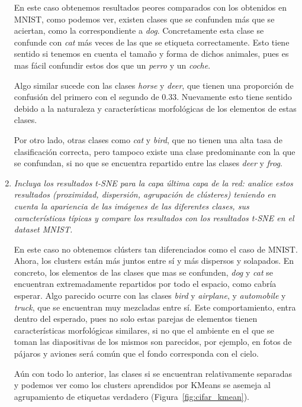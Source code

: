 \documentclass[11pt]{article}
\begin{document}
\begin{enumerate}
        En este caso obtenemos resultados peores comparados con los obtenidos en MNIST, como podemos ver, existen clases que se confunden más que se aciertan, como la correspondiente a \emph{dog}. Concretamente esta clase se confunde con \emph{cat} más veces de las que se etiqueta correctamente. Esto tiene sentido si tenemos en cuenta el tamaño y forma de dichos animales, pues es mas fácil confundir estos dos que un \emph{perro} y un \emph{coche}.

        Algo similar sucede con las clases \emph{horse} y \emph{deer}, que tienen una proporción de confusión del primero con el segundo de \( 0.33 \). Nuevamente esto tiene sentido debido a la naturaleza y características morfológicas de los elementos de estas clases.

        Por otro lado, otras clases como \emph{cat} y \emph{bird}, que no tienen una alta tasa de clasificación correcta, pero tampoco existe una clase predominante con la que se confundan, si no que se encuentra repartido entre las clases \emph{deer} y \emph{frog}.

    \item \emph{Incluya los resultados t-SNE para la capa última capa de la red: analice estos resultados (proximidad, dispersión, agrupación de clústeres) teniendo en cuenta la apariencia de las imágenes de las diferentes clases, sus características típicas y compare los resultados con los resultados t-SNE en el dataset MNIST.}
    
    En este caso no obtenemos clústers tan diferenciados como el caso de MNIST. Ahora, los clusters están más juntos entre sí y más dispersos y solapados. En concreto, los elementos de las clases que mas se confunden, \emph{dog} y \emph{cat} se encuentran extremadamente repartidos por todo el espacio, como cabría esperar. Algo parecido ocurre con las clases \emph{bird} y \emph{airplane}, y \emph{automobile} y \emph{truck}, que se encuentran muy mezcladas entre sí. Este comportamiento, entra dentro del esperado, pues no solo estas parejas de elementos tienen características morfológicas similares, si no que el ambiente en el que se toman las diapositivas de los mismos son parecidos, por ejemplo, en fotos de pájaros y aviones será común que el fondo corresponda con el cielo.

    Aún con todo lo anterior, las clases si se encuentran relativamente separadas y podemos ver como los clusters aprendidos por KMeans se asemeja al agrupamiento de etiquetas verdadero (Figura~\ref{fig:cifar_kmean}).


\end{enumerate}
\end{document}
